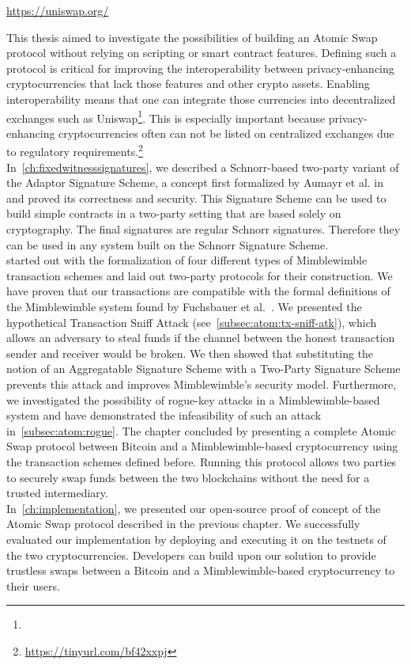 \urldef{\urluniswp}\url{https://uniswap.org/}

This thesis aimed to investigate the possibilities of building an Atomic Swap protocol without relying on scripting or smart contract features.
Defining such a protocol is critical for improving the interoperability between privacy-enhancing cryptocurrencies that lack those features and other crypto assets.
Enabling interoperability means that one can integrate those currencies into decentralized exchanges such as Uniswap\footnote{\urluniswp}.
This is especially important because privacy-enhancing cryptocurrencies often can not be listed on centralized exchanges due to regulatory requirements.\footnote{\url{https://tinyurl.com/bf42xxpj}}\\
In~\cref{ch:fixedwitnesssignatures}, we described a Schnorr-based two-party variant of the Adaptor Signature Scheme, a concept first formalized by Aumayr et al. in~\cite{aumayr2020bitcoinchannels} and proved its correctness and security.
This Signature Scheme can be used to build simple contracts in a two-party setting that are based solely on cryptography.
The final signatures are regular Schnorr signatures.
Therefore they can be used in any system built on the Schnorr Signature Scheme.\\
 started out with the formalization of four different types of Mimblewimble transaction schemes and laid out two-party protocols for their construction.
We have proven that our transactions are compatible with the formal definitions of the Mimblewimble system found by Fuchsbauer et al.~\cite{fuchsbauer2019aggregate}.
We presented the hypothetical Transaction Sniff Attack (see~\cref{subsec:atom:tx-sniff-atk}), which allows an adversary to steal funds if the channel between the honest transaction sender and receiver would be broken.
We then showed that substituting the notion of an Aggregatable Signature Scheme with a Two-Party Signature Scheme prevents this attack and improves Mimblewimble's security model.
Furthermore, we investigated the possibility of rogue-key attacks in a Mimblewimble-based system and have demonstrated the infeasibility of such an attack in~\cref{subsec:atom:rogue}.
The chapter concluded by presenting a complete Atomic Swap protocol between Bitcoin and a Mimblewimble-based cryptocurrency using the transaction schemes defined before.
Running this protocol allows two parties to securely swap funds between the two blockchains without the need for a trusted intermediary.\\
In~\cref{ch:implementation}, we presented our open-source proof of concept of the Atomic Swap protocol described in the previous chapter.
We successfully evaluated our implementation by deploying and executing it on the testnets of the two cryptocurrencies.
Developers can build upon our solution to provide trustless swaps between a Bitcoin and a Mimblewimble-based cryptocurrency to their users.

